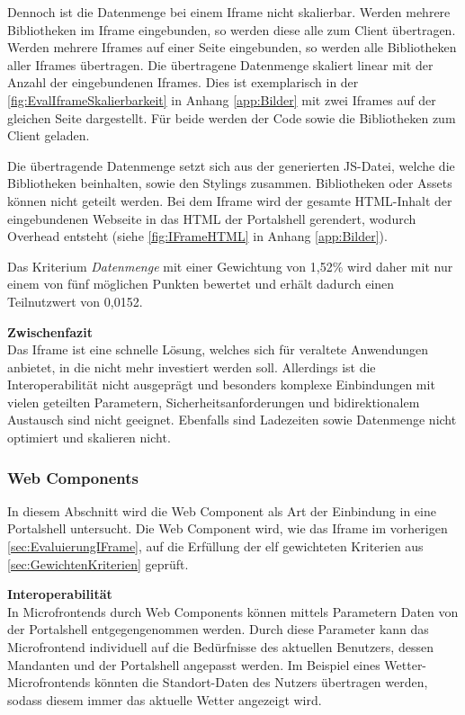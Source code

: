 Dennoch ist die Datenmenge bei einem Iframe nicht skalierbar. Werden mehrere Bibliotheken im Iframe eingebunden, so werden diese alle zum Client übertragen. Werden mehrere Iframes auf einer Seite eingebunden, so werden alle Bibliotheken aller Iframes übertragen. Die übertragene Datenmenge skaliert linear mit der Anzahl der eingebundenen Iframes. Dies ist exemplarisch in der \cref{fig:EvalIframeSkalierbarkeit} in Anhang \ref{app:Bilder} mit zwei Iframes auf der gleichen Seite dargestellt. Für beide werden der Code sowie die Bibliotheken zum Client geladen.

Die übertragende Datenmenge setzt sich aus der generierten \gls{JS}-Datei, welche die Bibliotheken beinhalten, sowie den Stylings zusammen. Bibliotheken oder Assets können nicht geteilt werden. Bei dem Iframe wird der gesamte \gls{HTML}-Inhalt der eingebundenen Webseite in das HTML der Portalshell gerendert, wodurch Overhead entsteht (siehe \cref{fig:IFrameHTML} in Anhang \ref{app:Bilder}).

Das Kriterium \textit{Datenmenge} mit einer Gewichtung von 1,52\% wird daher mit nur einem von fünf möglichen Punkten bewertet und erhält dadurch einen Teilnutzwert von 0,0152.

\textbf{Zwischenfazit}\\
Das Iframe ist eine schnelle Lösung, welches sich für veraltete Anwendungen anbietet, in die nicht mehr investiert werden soll. Allerdings ist die Interoperabilität nicht ausgeprägt und besonders komplexe Einbindungen mit vielen geteilten Parametern, Sicherheitsanforderungen und bidirektionalem Austausch sind nicht geeignet. Ebenfalls sind Ladezeiten sowie Datenmenge nicht optimiert und skalieren nicht.

\subsubsection{Web Components}\label{sec:EvaluierungWebComponents}

In diesem Abschnitt wird die Web Component als Art der Einbindung in eine Portalshell untersucht. Die Web Component wird, wie das Iframe im vorherigen \cref{sec:EvaluierungIFrame}, auf die Erfüllung der elf gewichteten Kriterien aus \cref{sec:GewichtenKriterien} geprüft.

\textbf{Interoperabilität}\\
In Microfrontends durch Web Components können mittels Parametern Daten von der Portalshell entgegengenommen werden. Durch diese Parameter kann das Microfrontend individuell auf die Bedürfnisse des aktuellen Benutzers, dessen Mandanten und der Portalshell angepasst werden. Im Beispiel eines Wetter-Microfrontends könnten die Standort-Daten des Nutzers übertragen werden, sodass diesem immer das aktuelle Wetter angezeigt wird.

